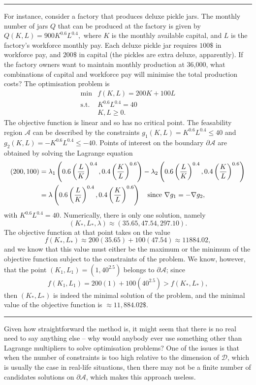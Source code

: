 \begin{center}\rule{0.5\linewidth}{.4pt}\end{center}
For instance, consider a factory that produces deluxe pickle jars. The monthly number of jars $Q$ that can be produced at the factory is given by 
$Q(K,L)=900K^{0.6}L^{0.4},$  where $K$ is the monthly available capital, and $L$ is the factory's workforce monthly pay. Each deluxe pickle jar requires $100\$$ in workforce pay, and $200\$$ in capital (the pickles are extra deluxe, apparently). If the factory owners want to maintain monthly production at 36,000, what combinations of capital and workforce pay will minimise the total production costs? \newl The optimisation problem is 
\[\begin{array}{rl}
\min & f(K,L)=200K+100L \\
\mbox{s.t.}
 & K^{0.6}L^{0.4}=40 \\ 
 & K,L \geq 0.
\end{array}\]
The objective function is linear and so has no critical point. The feasability region $\mathcal{A}$ can be described by the constraints $g_1(K,L)=K^{0.6}L^{0.4}\leq 40$ and $g_2(K,L)=-K^{0.6}L^{0.4}\leq -40$. Points of interest on the boundary $\partial\!\!\mathcal{A}$ are obtained by solving the Lagrange equation 
\begin{align*}(200,100)&=\lambda_1\left(0.6\left(\frac{L}{K}\right)^{0.4},0.4\left(\frac{K}{L}\right)^{0.6}\right)-\lambda_2\left(0.6\left(\frac{L}{K}\right)^{0.4},0.4\left(\frac{K}{L}\right)^{0.6}\right) \notag \\ &=\lambda\left(0.6\left(\frac{L}{K}\right)^{0.4},0.4\left(\frac{K}{L}\right)^{0.6}\right) \quad\mbox{since }\nabla g_1 = -\nabla g_2, \end{align*} with $K^{0.6}L^{0.4}=40.$ Numerically, there is only one solution, namely  $$(K_*,L_*,\lambda)\approx (35.65,47.54,297.10).$$ The objective function at that point takes on the value $$f(K_*,L_*)\approx 200(35.65)+100(47.54)\approx 11884.02,$$ and we know that this value must either be the maximum or the minimum of the objective function subject to the constraints of the problem. We know, however, that the point $(K_1,L_1)= (1,40^{2.5})$ belongs to $\partial\!\!\mathcal{A}$; since $$f(K_1,L_1)=200(1)+100(40^{2.5}) >  f(K_*,L_*),$$ then $(K_*,L_*)$ is indeed the minimal solution of the problem, and the minimal value of the objective function is $\approx 11,884.02\$$. 
\begin{center}\rule{0.5\linewidth}{.4pt}\end{center} Given how straightforward the method is, it might seem that there is no real need to say anything else -- why would anybody ever use something other than Lagrange multipliers to solve optimisation problems? One of the issues is that when the number of constraints is too high relative to the dimension of $\mathcal{D}$, which is usually the case in real-life situations, then there may not be a finite number of candidates solutions on $\partial \!\! \mathcal{A}$, which makes this approach useless. 
